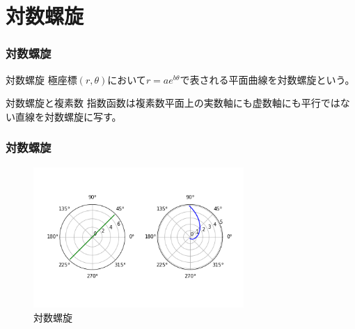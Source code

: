 \documentclass[dvipdfmx,11pt,notheorems]{beamer}
\theoremstyle{definition}
\begin{document}
\section{対数螺旋}

\begin{frame}[fragile]\frametitle{対数螺旋}

\begin{block}{対数螺旋}
極座標$(r, \theta)$において$r = ae^{b\theta}$で表される平面曲線を対数螺旋という。
\end{block}

\begin{block}{対数螺旋と複素数}
指数函数は複素数平面上の実数軸にも虚数軸にも平行ではない直線を対数螺旋に写す。
\end{block}

\end{frame}

\begin{frame}[fragile]\frametitle{対数螺旋}

\begin{figure}
  \centering
  \includegraphics[width=8cm]{log_spiral.png}
  \caption{対数螺旋}
\end{figure}

\end{frame}


\setcounter{framenumber}{\value{finalframe}}
\end{document}
